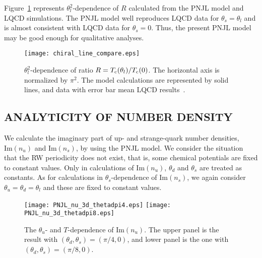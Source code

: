 \documentclass[prd,superscriptaddress,unsortedaddress,
twocolumn,showpacs,preprintnumbers,amsmath,amssymb]{revtex4}
\begin{document}
  Figure~\ref{chiral_line} represents $\theta^2_{l}$-dependence
  of $R$ calculated from the PNJL model and LQCD simulations.
  The PNJL model well reproduces LQCD data for $\theta_{s}=\theta_{l}$ 
  and is almost consistent with LQCD data for $\theta_{s}=0$. 
  Thus, the present PNJL model may be good enough for qualitative analyses.   

     \begin{figure}[t]
  \begin{center}
   \texttt{[image: chiral\_line\_compare.eps]}
   \end{center}
      \caption{
      $\theta^2_{l}$-dependence of ratio
      $R=T_{\rm c}(\theta_{l})/T_{\rm c}(0)$.
      The horizontal axis is normalized by $\pi^2$.
      The model calculations are represented by solid lines,
      and data with error bar mean LQCD results~\cite{Bonati2}.
}
\label{chiral_line}
     \end{figure}

  
  \subsection{ANALYTICITY OF NUMBER DENSITY}
  We calculate the imaginary part of
  up- and strange-quark number densities,
  $\textrm{Im}\left(n_{u}\right)$ and $\textrm{Im}\left(n_{s}\right)$,
  by using the PNJL model.
  We consider the situation that the RW periodicity does not exist,
  that is, some chemical potentials are fixed to constant values.
  Only in calculations of
  $\textrm{Im}\left(n_{u}\right)$,
  $\theta_{d}$ and $\theta_{s}$ are treated as constants.
  As for calculations in
  $\theta_{s}$-dependence of $\textrm{Im}\left(n_{s}\right)$,
  we again consider $\theta_{u}=\theta_{d}=\theta_{l}$
  and these are fixed to constant values.

  \begin{figure}[t]
   \begin{center}
    \texttt{[image: PNJL\_nu\_3d\_thetadpi4.eps]}
    \texttt{[image: PNJL\_nu\_3d\_thetadpi8.eps]}
   \end{center}
       \caption{
   The $\theta_{u}$- and $T$-dependence of $\textrm{Im}(n_{u})$.
   The upper panel is the result with
   $(\theta_{d},\theta_{s})=(\pi/4,0)$,
   and lower panel is the one with $(\theta_{d},\theta_{s})=(\pi/8,0)$.
      }
      \label{Fig_nu_3d}
  \end{figure}
\end{document}

